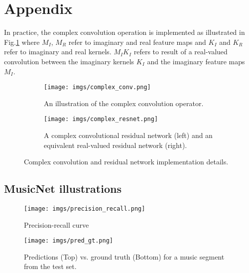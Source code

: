 \documentclass{article}
\begin{document}
\medskip

\small





\newpage

\section{Appendix} \label{appendix}
In practice, the complex convolution operation is implemented as illustrated in Fig.\ref{fig:complex_conv} where $M_I$, $M_R$ refer to imaginary and real feature maps and $K_I$ and $K_R$ refer to imaginary and real kernels. $M_IK_I$ refers to result of a real-valued convolution between the imaginary kernels $K_I$ and the imaginary feature maps $M_I$.
\begin{figure}[h!]
    \begin{subfigure}[b]{0.5\linewidth}
  \centering
  \texttt{[image: imgs/complex\_conv.png]}
  \caption{An illustration of the complex convolution operator.}
    \label{fig:complex_conv}
    \end{subfigure}
    \quad
    \begin{subfigure}[b]{0.5\linewidth}
  \centering
  \texttt{[image: imgs/complex\_resnet.png]}
  \caption{A complex convolutional residual network (left) and an equivalent real-valued      			 residual network (right).}
    \label{fig:complex_resnet}
    \end{subfigure}
    \caption{Complex convolution and residual network implementation details.}
\end{figure}

\subsection{MusicNet illustrations}

\begin{figure}[h]
\centering
  \texttt{[image: imgs/precision\_recall.png]}
  \caption{Precision-recall curve}
  \label{fig:music_precision_recall}
\end{figure}

\begin{figure}[h]
\centering
  \texttt{[image: imgs/pred\_gt.png]}
\caption{Predictions (Top) vs. ground truth (Bottom) for a music segment from the test set.}
\label{fig:music_pred}
\label{fig:music}
\end{figure}
\end{document}
